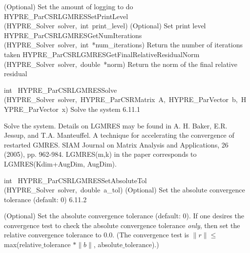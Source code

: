 \documentclass{article}
\begin{document}
\begin{cxxentry}
\begin{cxxentry}
\begin{cxxnames}
        {
(Optional) Set the amount of logging to do}
        {}
\label{cxx.6.11.12}
        {HYPRE\_ParCSRLGMRESSetPrintLevel}
        {(HYPRE\_Solver\ solver,\ int\ print\_level)}
        {
(Optional) Set print level}
        {}
\label{cxx.6.11.13}
        {HYPRE\_ParCSRLGMRESGetNumIterations}
        {(HYPRE\_Solver\ solver,\ int\ *num\_iterations)}
        {
Return the number of iterations taken}
        {}
\label{cxx.6.11.14}
        {HYPRE\_ParCSRLGMRESGetFinalRelativeResidualNorm}
        {(HYPRE\_Solver\ solver,\ double\ *norm)}
        {
Return the norm of the final relative residual}
        {}
\label{cxx.6.11.15}
\end{cxxnames}
\begin{cxxfunction}
{int\ }
        {HYPRE\_ParCSRLGMRESSolve}
        {(HYPRE\_Solver\ solver,\ HYPRE\_ParCSRMatrix\ A,\ HYPRE\_ParVector\ b,\ HYPRE\_ParVector\ x)}
        {
Solve the system}
        {6.11.1}
\begin{cxxdoc}

Solve the system. Details on LGMRES may be found in A. H. Baker,
E.R. Jessup, and T.A. Manteuffel. A technique for accelerating the
convergence of restarted GMRES. SIAM Journal on Matrix Analysis and
Applications, 26 (2005), pp. 962-984. LGMRES(m,k) in the paper
corresponds to LGMRES(Kdim+AugDim, AugDim).
\end{cxxdoc}
\end{cxxfunction}
\begin{cxxfunction}
{int\ }
        {HYPRE\_ParCSRLGMRESSetAbsoluteTol}
        {(HYPRE\_Solver\ solver,\ double\ a\_tol)}
        {
(Optional) Set the absolute convergence tolerance (default: 0)}
        {6.11.2}
\begin{cxxdoc}

(Optional) Set the absolute convergence tolerance (default: 0). 
If one desires
the convergence test to check the absolute convergence tolerance {\it only}, then
set the relative convergence tolerance to 0.0.  (The convergence test is 
$\|r\| \leq$ max(relative$\_$tolerance $\ast \|b\|$, absolute$\_$tolerance).)


\end{cxxdoc}
\end{cxxfunction}
\end{cxxentry}
\end{cxxentry}
\end{document}
